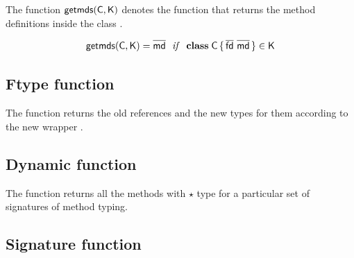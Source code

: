 \documentclass[acmlarge, anonymous, authordraft]{acmart}
\begin{document}
The function $\getmds\C\K$ denotes the function that returns the method definitions inside the class \C.

\begin{equation*}
\getmds\C\K = \b\md ~~\mathit{if}~~ \Class\C{\b{\fd}}{\b\md} \in \K
\end{equation*}

\subsection{Ftype function}

The function \ftypes\a\C\s\K returns the old references and the new types
for them according to the new wrapper \C.

\begin{mathpar}
\end{mathpar}


\subsection{Dynamic function}

The  function returns all the methods with $\star$ type for a particular set of 
signatures of method typing.

\begin{mathpar}



\end{mathpar}

\subsection{Signature function}
\end{document}
